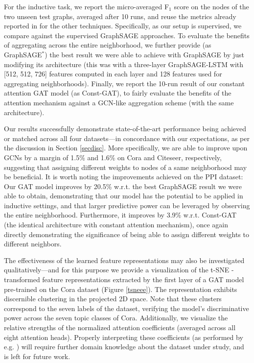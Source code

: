 \documentclass{article} %
\begin{document}
For the inductive task, we report the micro-averaged F$_1$ score on the nodes of the two unseen test graphs, averaged after 10 runs, and reuse the metrics already reported in \cite{hamilton2017inductive} for the other techniques. Specifically, as our setup is supervised, we compare against the supervised GraphSAGE approaches. To evaluate the benefits of aggregating across the entire neighborhood, we further provide (as GraphSAGE$^*$) the best result we were able to achieve with GraphSAGE by just modifying its architecture (this was with a three-layer GraphSAGE-LSTM with [512, 512, 726] features computed in each layer and 128 features used for aggregating neighborhoods). Finally, we report the 10-run result of our constant attention GAT model (as Const-GAT), to fairly evaluate the benefits of the attention mechanism against a GCN-like aggregation scheme (with the same architecture).

Our results successfully demonstrate state-of-the-art performance being achieved or matched across all four datasets---in concordance with our expectations, as per the discussion in Section \ref{secdisc}. More specifically, we are able to improve upon GCNs by a margin of 1.5\% and 1.6\% on Cora and Citeseer, respectively, suggesting that assigning different weights to nodes of a same neighborhood may be beneficial. It is worth noting the improvements achieved on the PPI dataset: Our GAT model improves by 20.5\% w.r.t. the best GraphSAGE result we were able to obtain, demonstrating that our model has the potential to be applied in inductive settings, and that larger predictive power can be leveraged by observing the entire neighborhood. Furthermore, it improves by 3.9\% w.r.t. Const-GAT (the identical architecture with constant attention mechanism), once again directly demonstrating the significance of being able to assign different weights to different neighbors.

The effectiveness of the learned feature representations may also be investigated qualitatively---and for this purpose we provide a visualization of the t-SNE \citep{maaten2008visualizing}-transformed feature representations extracted by the first layer of a GAT model pre-trained on the Cora dataset (Figure \ref{tsneee}). The representation exhibits discernible clustering in the projected 2D space. Note that these clusters correspond to the seven labels of the dataset, verifying the model's discriminative power across the seven topic classes of Cora. Additionally, we visualize the relative strengths of the normalized attention coefficients (averaged across all eight attention heads). Properly interpreting these coefficients (as performed by e.g. \cite{bahdanau2014neural}) will require further domain knowledge about the dataset under study, and is left for future work.
\end{document}
